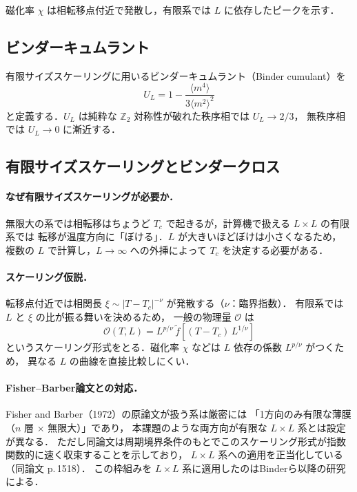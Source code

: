 \documentclass[12pt,a4paper]{ltjsarticle}
\begin{document}
磁化率 $\chi$ は相転移点付近で発散し，有限系では $L$ に依存したピークを示す．

\subsection{ビンダーキュムラント}

有限サイズスケーリングに用いるビンダーキュムラント（Binder cumulant）を
\begin{equation}
  U_L = 1 - \frac{\langle m^4 \rangle}{3\langle m^2 \rangle^2}
  \label{eq:binder}
\end{equation}
と定義する．$U_L$ は純粋な $\mathbb{Z}_2$ 対称性が破れた秩序相では $U_L \to 2/3$，
無秩序相では $U_L \to 0$ に漸近する．

\subsection{有限サイズスケーリングとビンダークロス}

\paragraph{なぜ有限サイズスケーリングが必要か．}
無限大の系では相転移はちょうど $T_c$ で起きるが，計算機で扱える $L \times L$ の有限系では
転移が温度方向に「ぼける」．$L$ が大きいほどぼけは小さくなるため，
複数の $L$ で計算し，$L \to \infty$ への外挿によって $T_c$ を決定する必要がある．

\paragraph{スケーリング仮説．}
転移点付近では相関長 $\xi \sim |T - T_c|^{-\nu}$ が発散する（$\nu$：臨界指数）．
有限系では $L$ と $\xi$ の比が振る舞いを決めるため，
一般の物理量 $\mathcal{O}$ は
\begin{equation}
  \mathcal{O}(T, L) = L^{p/\nu}\, \tilde{f}\!\left[(T - T_c)\,L^{1/\nu}\right]
\end{equation}
というスケーリング形式をとる．磁化率 $\chi$ などは $L$ 依存の係数 $L^{p/\nu}$ がつくため，
異なる $L$ の曲線を直接比較しにくい．

\paragraph{Fisher--Barber論文との対応．}
Fisher and Barber（1972）の原論文が扱う系は厳密には
「1方向のみ有限な薄膜（$n$ 層 $\times$ 無限大）」であり，
本課題のような両方向が有限な $L \times L$ 系とは設定が異なる．
ただし同論文は周期境界条件のもとでこのスケーリング形式が指数関数的に速く収束することを示しており，
$L \times L$ 系への適用を正当化している（同論文 p.\,1518）．
この枠組みを $L \times L$ 系に適用したのはBinderら以降の研究による．
\end{document}
